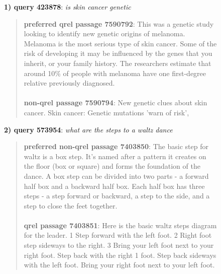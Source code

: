 \documentclass[fullpage]{article}
\begin{document}
\begin{figure}[t]
{\bf 1) query 423878}: {\em is skin cancer genetic}\\
\begin{quote}
{\bf preferred qrel passage 7590792}:
This was a genetic study looking to identify new genetic origins of melanoma. Melanoma is the most serious type of skin cancer. Some of the risk of developing it may be influenced by the genes that you inherit, or your family history. The researchers estimate that around 10\% of people with melanoma have one first-degree relative previously diagnosed.\\
\\
{\bf non-qrel passage 7590794}:
New genetic clues about skin cancer. Skin cancer: Genetic mutations 'warn of risk',\\
\end{quote}

{\bf 2) query 573954}: {\em what are the steps to a waltz dance}\\
\begin{quote}
{\bf preferred non-qrel passage 7403850}:
The basic step for waltz is a box step. It's named after a pattern it creates on the floor (box or square) and forms the foundation of the dance. A box step can be divided into two parts - a forward half box and a backward half box. Each half box has three steps - a step forward or backward, a step to the side, and a step to close the feet together.\\
\\
{\bf qrel passage 7403851}:
Here is the basic waltz steps diagram for the leader. 1  Step forward with the left foot. 2  Right foot step sideways to the right. 3  Bring your left foot next to your right foot.  Step back with the right 1  foot. Step back sideways with the left foot.  Bring your right foot next to your left foot.\\
\end{quote}


\end{figure}
\end{document}
